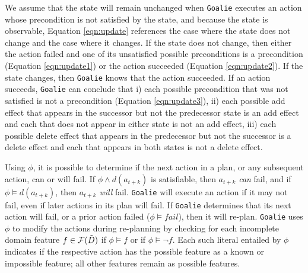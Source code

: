 \documentclass{article}
\def\FFRISKY{{\tt DeFAULT}}
\def\goalie{{\tt Goalie}}
\begin{document}
\noindent We assume that the state will remain unchanged when \goalie{} executes an action whose precondition is not satisfied by the state, and because the state is observable, Equation \ref{eqn:update} references the case where the state does not change and the case where it changes.  If the state does not change, then either the action failed and one of its unsatisfied possible preconditions is a precondition (Equation \ref{eqn:update1}) or the action succeeded (Equation \ref{eqn:update2}).  If the state changes, then \goalie{} knows that the action succeeded.  If an action succeeds, \goalie{} can conclude that i) each possible precondition that was not satisfied is not a precondition (Equation \ref{eqn:update3}), ii) each possible add effect that appears in the successor but not the predecessor state is an add effect and each that does not appear in either state is not an add effect, iii) each possible delete effect that appears in the predecessor but not the successor is a delete effect and each that  appears in both states is not a delete effect.

Using $\phi$, it is possible to determine if the next action in a plan, or any subsequent action, can or will fail.  If  $\phi \wedge d(a_{t+k})$ is satisfiable, then $a_{t+k}$ {\em can} fail, and if $\phi \models d(a_{t+k})$, then $a_{t+k}$ {\em will}  fail.  \goalie{} will execute an action if it may not fail, even if later actions in its plan will fail.  If \goalie{} determines that its next action will fail, or a prior action failed ($\phi \models fail$), then it will re-plan.  \goalie{}  uses $\phi$ to modify the actions during re-planning by checking for each incomplete domain feature $f \in {\cal F}(\tilde{D})$ if $\phi \models f$ or if $\phi \models \neg f$.  Each such literal entailed by $\phi$ indicates if the respective action has the possible feature as a known or impossible feature; all other features remain as possible features.


\end{document}
